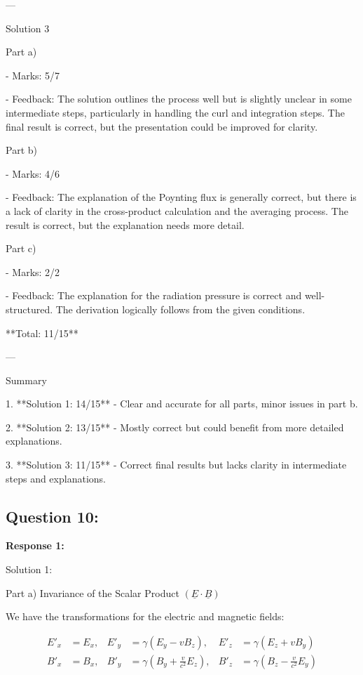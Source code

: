 \documentclass[a4paper,11pt]{article}
\begin{document}
---

Solution 3

Part a)

- Marks: 5/7

- Feedback: The solution outlines the process well but is slightly unclear in some intermediate steps, particularly in handling the curl and integration steps. The final result is correct, but the presentation could be improved for clarity.

Part b)

- Marks: 4/6

- Feedback: The explanation of the Poynting flux is generally correct, but there is a lack of clarity in the cross-product calculation and the averaging process. The result is correct, but the explanation needs more detail.

Part c)

- Marks: 2/2

- Feedback: The explanation for the radiation pressure is correct and well-structured. The derivation logically follows from the given conditions.

**Total: 11/15**

---

Summary

1. **Solution 1: 14/15** - Clear and accurate for all parts, minor issues in part b.

2. **Solution 2: 13/15** - Mostly correct but could benefit from more detailed explanations.

3. **Solution 3: 11/15** - Correct final results but lacks clarity in intermediate steps and explanations.

\subsection*{Question 10:}

\textbf{Response 1:}

Solution 1:

Part a) Invariance of the Scalar Product \((\underline{E} \cdot \underline{B})\)

We have the transformations for the electric and magnetic fields:

\[
\begin{aligned}
E'_{x} &= E_{x}, & E'_{y} &= \gamma(E_{y} - vB_{z}), & E'_{z} &= \gamma(E_{z} + vB_{y}) \\
B'_{x} &= B_{x}, & B'_{y} &= \gamma(B_{y} + \frac{v}{c^{2}} E_{z}), & B'_{z} &= \gamma(B_{z} - \frac{v}{c^{2}} E_{y})
\end{aligned}
\]
\end{document}
